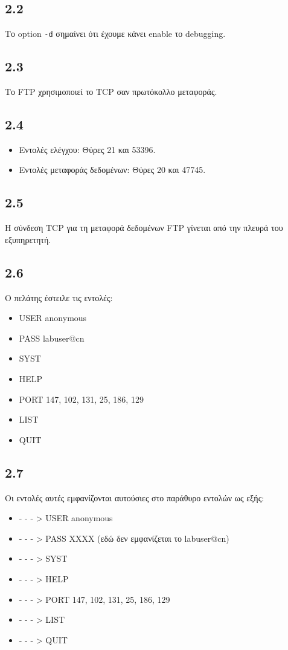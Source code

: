 		\subsection*{2.2}
			Το option \verb|-d| σημαίνει ότι έχουμε κάνει enable το debugging.
		
		\subsection*{2.3}
			Το FTP χρησιμοποιεί το TCP σαν πρωτόκολλο μεταφοράς.
		
		\subsection*{2.4}
			\begin{itemize}
				\item Εντολές ελέγχου: Θύρες 21 και 53396.
				\item Εντολές μεταφοράς δεδομένων: Θύρες 20 και 47745.
			\end{itemize}
		
		\subsection*{2.5}
			Η σύνδεση TCP για τη μεταφορά δεδομένων FTP γίνεται από την πλευρά του εξυπηρετητή.
		
		\subsection*{2.6}
			Ο πελάτης έστειλε τις εντολές:
		
			\begin{itemize}
				\item USER anonymous
				\item PASS labuser@cn
				\item SYST
				\item HELP
				\item PORT 147, 102, 131, 25, 186, 129
				\item LIST
				\item QUIT
			\end{itemize}
								
		\subsection*{2.7}
			Οι εντολές αυτές εμφανίζονται αυτούσιες στο παράθυρο εντολών ως εξής:
			
			\begin{itemize}
				\item - - - > USER anonymous
				\item - - - > PASS XXXX (εδώ δεν εμφανίζεται το labuser@cn)
				\item - - - > SYST
				\item - - - > HELP
				\item - - - > PORT 147, 102, 131, 25, 186, 129
				\item - - - > LIST
				\item - - - > QUIT
			\end{itemize}
		
